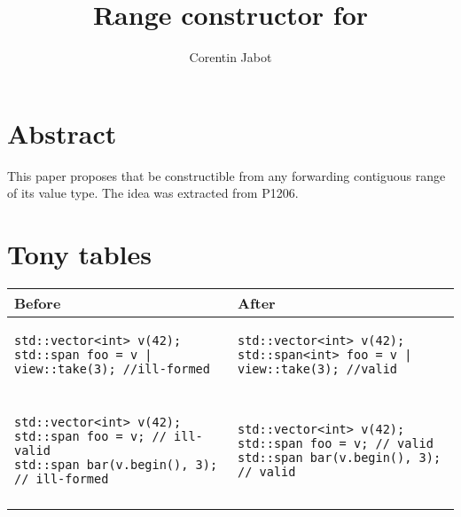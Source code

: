 \documentclass{wg21}
\title{Range constructor for \tcode{std::span}}
\author{Corentin Jabot}{corentin.jabot@gmail.com}
\begin{document}
\maketitle

\section{Abstract}

This paper proposes that  be constructible from any forwarding contiguous range of its value type.
The idea was extracted from P1206.

\section{Tony tables}
\begin{center}
\begin{tabular}{l|l}
Before & After\\ \hline

\begin{minipage}[t]{0.5\textwidth}
\begin{verbatim}
std::vector<int> v(42);
std::span foo = v | view::take(3); //ill-formed
\end{verbatim}
\end{minipage}
&
\begin{minipage}[t]{0.5\textwidth}
\begin{verbatim}
std::vector<int> v(42);
std::span<int> foo = v | view::take(3); //valid
\end{verbatim}
\end{minipage}
\\\\ \hline


\begin{minipage}[t]{0.5\textwidth}
\begin{verbatim}
std::vector<int> v(42);
std::span foo = v; // ill-valid
std::span bar(v.begin(), 3); // ill-formed
\end{verbatim}
\end{minipage}
&
\begin{minipage}[t]{0.5\textwidth}
\begin{verbatim}
std::vector<int> v(42);
std::span foo = v; // valid
std::span bar(v.begin(), 3); // valid

\end{verbatim}
\end{minipage}
\\\\ \hline


\end{tabular}
\end{center}
\end{document}
